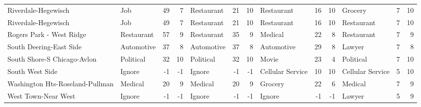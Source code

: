 \begin{tabular}[htbp]
\begin{tabular}{llrrlrrlrrlrr}
    Riverdale-Hegewisch & Job   & 49    & 7     & Restaurant & 21    & 10    & Restaurant & 16    & 10    & Grocery & 7     & 10 \\
    Riverdale-Hegewisch & Job   & 49    & 7     & Restaurant & 21    & 10    & Restaurant & 16    & 10    & Restaurant & 7     & 10 \\
    Rogers Park - West Ridge & Restaurant & 57    & 9     & Restaurant & 35    & 9     & Medical & 22    & 8     & Restaurant & 7     & 9 \\
    South Deering-East Side & Automotive & 37    & 8     & Automotive & 37    & 8     & Automotive & 29    & 8     & Lawyer & 7     & 8 \\
    South Shore-S Chicago-Avlon & Political & 32    & 10    & Political & 32    & 10    & Movie & 23    & 4     & Political & 7     & 10 \\
    South West Side & Ignore & -1    & -1    & Ignore & -1    & -1    & Cellular Service & 10    & 10    & Cellular Service & 5     & 10 \\
    Washington Hts-Roseland-Pullman & Medical & 20    & 9     & Medical & 20    & 9     & Grocery & 22    & 6     & Medical & 7     & 9 \\
    West Town-Near West & Ignore & -1    & -1    & Ignore & -1    & -1    & Ignore & -1    & -1    & Lawyer & 5     & 9 \\
    \end{tabular}%
  \label{tab:addlabel}%
\end{tabular}%
